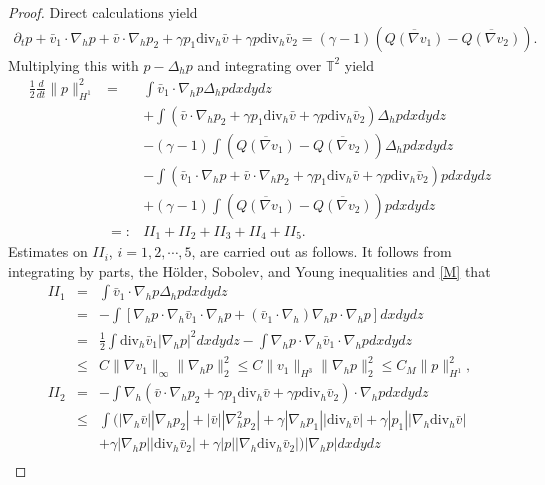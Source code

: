 \documentclass[12pt,reqno]{amsart}
\numberwithin{equation}{section}
\begin{document}
\begin{proof}
  Direct calculations yield
  \begin{align*}
    \partial_tp+\bar v_1\cdot\nabla_hp+\bar v\cdot\nabla_hp_2+\gamma p_1\text{div}_h\bar v+\gamma p\text{div}_h\bar v_2
    =(\gamma-1)\left(\overline{Q(\nabla v_1)}-\overline{Q(\nabla v_2)}\right).
  \end{align*}
  Multiplying this with $p-\Delta_hp$ and integrating over $\mathbb T^2$ yield
  \begin{eqnarray}
    \frac12\frac{d}{dt}\|p\|_{H^1}^2&=&\int\bar v_1\cdot\nabla_hp\Delta_hpdxdydz\nonumber\\
    &&+\int(\bar v\cdot\nabla_hp_2+\gamma p_1\text{div}_h\bar v+\gamma p\text{div}_h\bar v_2)\Delta_hpdxdydz\nonumber\\
    &&-(\gamma-1)\int \left(\overline{Q(\nabla v_1)}-\overline{Q(\nabla v_2)}\right)\Delta_hp dxdydz\nonumber\\
    &&-\int(\bar v_1\cdot\nabla_hp+\bar v\cdot\nabla_hp_2+\gamma p_1\text{div}_h\bar v+\gamma p\text{div}_h\bar v_2)pdxdydz\nonumber\\
    &&+(\gamma-1)\int \left(\overline{Q(\nabla v_1)}-\overline{Q(\nabla v_2)}\right)pdxdydz\nonumber\\
    &=:&II_1+II_2+II_3+II_4+II_5. \label{AD1}
  \end{eqnarray}
  Estimates on $II_i$, $i=1,2,\cdots,5$, are carried out as follows. It follows from integrating by parts, the H\"older, Sobolev, and Young inequalities and \eqref{M} that
  \begin{eqnarray*}
    II_1&=&\int\bar v_1\cdot\nabla_hp\Delta_hpdxdydz\nonumber\\
    &=&-\int[\nabla_hp\cdot\nabla_h\bar v_1\cdot\nabla_hp+(\bar v_1\cdot\nabla_h)\nabla_hp
    \cdot\nabla_hp]dxdydz\\
    &=&\frac12\int\text{div}_h\bar v_1|\nabla_hp|^2dxdydz-\int\nabla_hp\cdot\nabla_h\bar v_1\cdot\nabla_hpdxdydz \\
    &\leq&C\|\nabla v_1\|_\infty\|\nabla_hp\|_2^2\leq C\|v_1\|_{H^3}\|\nabla_hp\|_2^2\leq C_M\|p\|_{H^1}^2, \\
    II_2&=&-\int\nabla_h(\bar v\cdot\nabla_hp_2+\gamma p_1\text{div}_h\bar v+\gamma p\text{div}_h\bar v_2)\cdot\nabla_hpdxdydz\\
    &\leq&\int(|\nabla_h\bar v||\nabla_hp_2|+|\bar v||\nabla_h^2p_2|+\gamma|\nabla_hp_1||\text{div}_h\bar v|+\gamma|p_1|
    |\nabla_h\text{div}_h\bar v|\\
    &&+\gamma|\nabla_hp||\text{div}_h\bar v_2|+\gamma|p||\nabla_h\text{div}_h\bar v_2|)|\nabla_hp|dxdydz\\

\end{eqnarray*}
\end{proof}
\end{document}
